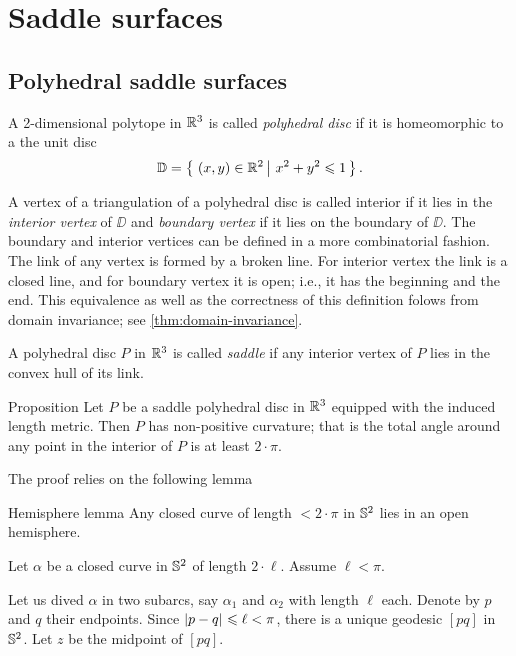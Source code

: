 \chapter{Saddle surfaces}

\section{Polyhedral saddle surfaces}


A 2-dimensional polytope in $\mathbb{R}^3$ is called 
\emph{polyhedral disc} if it is homeomorphic to a the unit disc
\[\DD=\set{(x,y)\in\RR^2}{x^2+y^2\le 1}.\]

A vertex of a triangulation of a polyhedral disc 
is called interior if it lies in the \emph{interior vertex} of $\DD$ 
and \emph{boundary vertex} if it lies on the boundary of $\DD$.
The boundary and interior vertices can be defined in a more combinatorial fashion.
The link of any vertex is formed by a broken line.
For interior vertex the link is a closed line,
and for boundary vertex it is open; 
i.e., it has the beginning and the end.
This equivalence as well as the correctness of this definition folows from domain invariance;
see \ref{thm:domain-invariance}.

A polyhedral disc $P$ in $\mathbb{R}^3$
is called \emph{saddle} if any interior vertex of $P$ lies in the convex hull of its link.

\begin{thm}{Proposition}\label{prop:neg-poly}
Let $P$ be a saddle polyhedral disc in $\mathbb{R}^3$
equipped with the induced length metric. 
Then $P$ has non-positive curvature;
that is the total angle around any point in the interior of $P$ is at least $2\cdot\pi$.
\end{thm}

The proof relies on the following lemma

\begin{thm}{Hemisphere lemma}
\label{lem:hemisphere}
Any closed curve of length $<2\cdot \pi$  in $\mathbb{S}^2$ lies in an open hemisphere. 
\end{thm}

Let $\alpha$ be a closed curve in $\mathbb{S}^2$ of length $2\cdot\ell$.
Assume $\ell<\pi$.

Let us dived $\alpha$ in two subarcs, 
say $\alpha_1$ and $\alpha_2$ with length $\ell$ each. 
Denote by $p$ and $q$ their endpoints. 
Since $\dist{p}{q}{}\z\le\ell<\pi$, there is a unique geodesic $[pq]$ in $\mathbb{S}^2$.  
Let $z$ be the midpoint of $[pq]$.  

